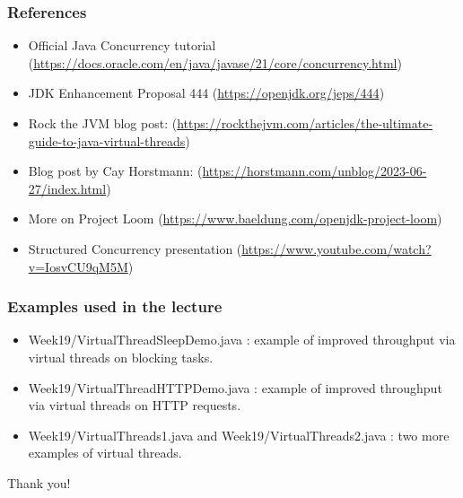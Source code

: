 \documentclass[xcolor={dvipsnames,svgnames},aspectratio=169]{beamer}
\begin{document}
\begin{frame}[fragile]
  \frametitle{References}

  \begin{itemize}
  \item[\faBook]<1-> Official Java Concurrency tutorial
    (\href{https://docs.oracle.com/en/java/javase/21/core/concurrency.html}{https://docs.oracle.com/en/java/javase/21/core/concurrency.html})
  \item[\faBook]<1-> JDK Enhancement Proposal 444
    (\href{https://openjdk.org/jeps/444}{https://openjdk.org/jeps/444})
  \item[\faBook]<1-> Rock the JVM blog post:
    (\href{https://rockthejvm.com/articles/the-ultimate-guide-to-java-virtual-threads}{https://rockthejvm.com/articles/the-ultimate-guide-to-java-virtual-threads})
  \item[\faBook]<1-> Blog post by Cay Horstmann:
    (\href{https://horstmann.com/unblog/2023-06-27/index.html}{https://horstmann.com/unblog/2023-06-27/index.html})
  \item[\faBook]<1-> More on Project Loom
    (\href{https://www.baeldung.com/openjdk-project-loom}{https://www.baeldung.com/openjdk-project-loom})
    \item[\faBook]<1-> Structured Concurrency presentation (\href{https://www.youtube.com/watch?v=IosvCU9qM5M}{https://www.youtube.com/watch?v=IosvCU9qM5M})
  \end{itemize}

\end{frame}

\begin{frame}[fragile]
  \frametitle{Examples  used in the lecture}

  \begin{itemize}
  \item[\faCode]<1-> Week19/VirtualThreadSleepDemo.java : example of improved
    throughput via virtual threads on blocking tasks.
  \item[\faCode]<1-> Week19/VirtualThreadHTTPDemo.java : example of improved
    throughput via virtual threads on HTTP requests.
  \item[\faCode]<1-> Week19/VirtualThreads1.java and
    Week19/VirtualThreads2.java : two more examples of virtual threads.
  \end{itemize}
\end{frame}


\begin{frame}{}
  \centering \huge
  Thank you!
\end{frame}
\end{document}
